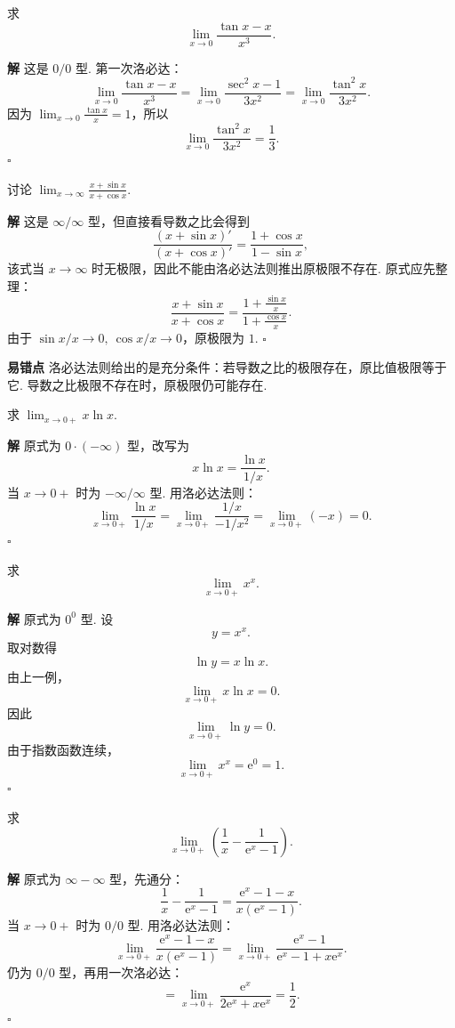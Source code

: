 \documentclass[fontset=fandol]{ctexart}
\newenvironment{solution}{\par\noindent\textbf{解}\quad}{\hfill$\square$\par\vspace{0.8em}}
\newenvironment{warning}{\par\noindent\textbf{易错点}\quad}{\par\vspace{0.8em}}
\newcommand{\ee}{\mathrm{e}}
\begin{document}
\begin{example}[三角函数高阶小量]
求
\[
\lim_{x\to0}\frac{\tan x-x}{x^3}.
\]
\end{example}
\begin{solution}
这是 $0/0$ 型. 第一次洛必达：
\[
\lim_{x\to0}\frac{\tan x-x}{x^3}
=\lim_{x\to0}\frac{\sec^2x-1}{3x^2}
=\lim_{x\to0}\frac{\tan^2x}{3x^2}.
\]
因为 $\lim_{x\to0}\frac{\tan x}{x}=1$，所以
\[
\lim_{x\to0}\frac{\tan^2x}{3x^2}
=\frac13.
\]
\end{solution}

\begin{example}[不能机械使用洛必达法则]
讨论 $\displaystyle\lim_{x\to\infty}\frac{x+\sin x}{x+\cos x}$.
\end{example}
\begin{solution}
这是 $\infty/\infty$ 型，但直接看导数之比会得到
\[
\frac{(x+\sin x)'}{(x+\cos x)'}=\frac{1+\cos x}{1-\sin x},
\]
该式当 $x\to\infty$ 时无极限，因此不能由洛必达法则推出原极限不存在. 原式应先整理：
\[
\frac{x+\sin x}{x+\cos x}
=\frac{1+\frac{\sin x}{x}}{1+\frac{\cos x}{x}}.
\]
由于 $\sin x/x\to0,\ \cos x/x\to0$，原极限为 $1$.
\end{solution}
\begin{warning}
洛必达法则给出的是充分条件：若导数之比的极限存在，原比值极限等于它. 导数之比极限不存在时，原极限仍可能存在.
\end{warning}

\begin{example}[转化未定式]
求 $\displaystyle\lim_{x\to0+}x\ln x$.
\end{example}
\begin{solution}
原式为 $0\cdot(-\infty)$ 型，改写为
\[
x\ln x=\frac{\ln x}{1/x}.
\]
当 $x\to0+$ 时为 $-\infty/\infty$ 型. 用洛必达法则：
\[
\lim_{x\to0+}\frac{\ln x}{1/x}
=\lim_{x\to0+}\frac{1/x}{-1/x^2}
=\lim_{x\to0+}(-x)=0.
\]
\end{solution}

\begin{example}[指数型未定式]
求
\[
\lim_{x\to0+}x^x.
\]
\end{example}
\begin{solution}
原式为 $0^0$ 型. 设
\[
y=x^x.
\]
取对数得
\[
\ln y=x\ln x.
\]
由上一例，
\[
\lim_{x\to0+}x\ln x=0.
\]
因此
\[
\lim_{x\to0+}\ln y=0.
\]
由于指数函数连续，
\[
\lim_{x\to0+}x^x=\ee^0=1.
\]
\end{solution}

\begin{example}[差型未定式]
求
\[
\lim_{x\to0+}\left(\frac1x-\frac1{\ee^x-1}\right).
\]
\end{example}
\begin{solution}
原式为 $\infty-\infty$ 型，先通分：
\[
\frac1x-\frac1{\ee^x-1}
=\frac{\ee^x-1-x}{x(\ee^x-1)}.
\]
当 $x\to0+$ 时为 $0/0$ 型. 用洛必达法则：
\[
\lim_{x\to0+}\frac{\ee^x-1-x}{x(\ee^x-1)}
=\lim_{x\to0+}\frac{\ee^x-1}{\ee^x-1+x\ee^x}.
\]
仍为 $0/0$ 型，再用一次洛必达：
\[
=\lim_{x\to0+}\frac{\ee^x}{2\ee^x+x\ee^x}
=\frac12.
\]
\end{solution}
\end{document}
